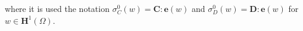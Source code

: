 where it is used the notation $\sigma_C^{0}(w) = \mathbf{C}:\mathbf{e}(w)$ and $\sigma_D^{0}(w) = \mathbf{D}:\mathbf{e}(w)$ for $w \in \mathbf{H}^1(\Omega)$.



